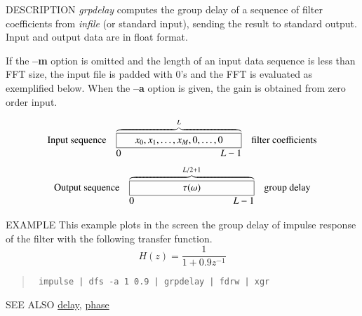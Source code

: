 \begin{qsection}{DESCRIPTION}
{\em grpdelay} computes the group delay of a sequence of filter coefficients 
from {\em infile} (or standard input), 
sending the result to standard output.
Input and output data are in float format.
\par
If the {\bf --m} option is omitted
and the length of an input data sequence is less than FFT size,
the input file is padded with 0's and the FFT is evaluated
as exemplified below.
When the {\bf --a} option is given,
the gain is obtained from zero order input.
\par
\[
\begin{array}{lll}
\mbox{Input sequence} & 
\overbrace{\framebox[4.5cm]{$x_0, x_1, \ldots, x_{M}, 0,
					\ldots,0$}}^{L}  & \mbox{filter coefficients}\\
		& \makebox[4.5cm]{0\hfill $L-1$} &
\end{array}
\]
\[
\begin{array}{lll}
\mbox{Output sequence} & \overbrace{\framebox[4.5cm]{$\tau(\omega)$}}^{L/2+1} &
	   \mbox{group delay}\\
		& \makebox[4.5cm]{0\hfill $L-1$} &

\end{array}
\]
\end{qsection}

\begin{options}
\end{options}


\begin{qsection}{EXAMPLE}
This example plots in the screen the group delay of impulse response
of the filter with the following transfer function.
\begin{displaymath}
  H(z)=\frac{1}{1+0.9z^{-1}}
\end{displaymath}
\begin{quote}
\verb! impulse | dfs -a 1 0.9 | grpdelay | fdrw | xgr !
\end{quote}  
\end{qsection}

\begin{qsection}{SEE ALSO}
\hyperlink{delay}{delay},
\hyperlink{phase}{phase}
\end{qsection}
